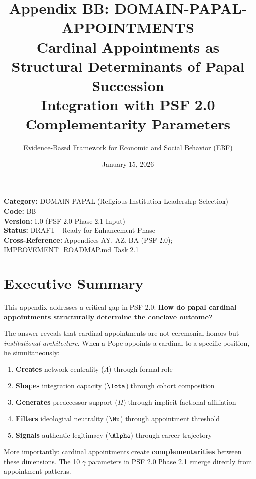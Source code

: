 \documentclass[11pt]{article}
\title{\textbf{Appendix BB: DOMAIN-PAPAL-APPOINTMENTS} \\ Cardinal Appointments as Structural Determinants of Papal Succession \\ Integration with PSF 2.0 Complementarity Parameters}
\author{Evidence-Based Framework for Economic and Social Behavior (EBF)}
\date{January 15, 2026}
\begin{document}
\maketitle

\begin{center}
\colorbox{lightgreen!30}{\begin{minipage}{0.95\textwidth}
\textbf{Category:} DOMAIN-PAPAL (Religious Institution Leadership Selection) \\
\textbf{Code:} BB \\
\textbf{Version:} 1.0 (PSF 2.0 Phase 2.1 Input) \\
\textbf{Status:} DRAFT - Ready for Enhancement Phase \\
\textbf{Cross-Reference:} Appendices AY, AZ, BA (PSF 2.0); IMPROVEMENT\_ROADMAP.md Task 2.1
\end{minipage}}
\end{center}

\section{Executive Summary}

This appendix addresses a critical gap in PSF 2.0: \textbf{How do papal cardinal appointments structurally determine the conclave outcome?}

The answer reveals that cardinal appointments are not ceremonial honors but \textit{institutional architecture}. When a Pope appoints a cardinal to a specific position, he simultaneously:

\begin{enumerate}
\item \textbf{Creates} network centrality ($\Lambda$) through formal role
\item \textbf{Shapes} integration capacity ($\Iota$) through cohort composition
\item \textbf{Generates} predecessor support ($\Pi$) through implicit factional affiliation
\item \textbf{Filters} ideological neutrality ($\Nu$) through appointment threshold
\item \textbf{Signals} authentic legitimacy ($\Alpha$) through career trajectory
\end{enumerate}

More importantly: cardinal appointments create \textbf{complementarities} between these dimensions. The 10 $\gamma$ parameters in PSF 2.0 Phase 2.1 emerge directly from appointment patterns.
\end{document}
